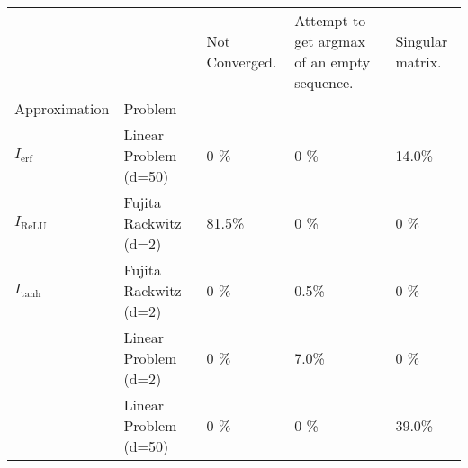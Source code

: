\begin{table}
\begin{tabular}{lllll}
 &  & Not Converged. & Attempt to get argmax of an empty sequence. & Singular matrix. \\
Approximation & Problem &  &  &  \\
$I_\text{erf}$ & Linear Problem (d=50) & 0 \% & 0 \% & 14.0\% \\
$I_\text{ReLU}$ & Fujita Rackwitz (d=2) & 81.5\% & 0 \% & 0 \% \\
$I_\text{tanh}$ & Fujita Rackwitz (d=2) & 0 \% & 0.5\% & 0 \% \\
 & Linear Problem (d=2) & 0 \% & 7.0\% & 0 \% \\
 & Linear Problem (d=50) & 0 \% & 0 \% & 39.0\% \\
\end{tabular}
\end{table}
